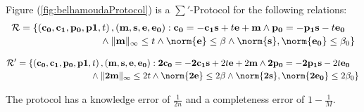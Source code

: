 \begin{theorem}
  Figure (\ref{fig:belhamoudaProtocol}) is a $\sum'$-Protocol for the following
  relations:
  \begin{equation}
    \label{equ:zkp_relation1}
    \begin{multlined}
      \mathcal{R} = \{ \left( \mathbf{c_0,c_1,p_0,p1},t \right), (\mathbf{m,
        s, e, e_0}): \mathbf{c_0 = -c_1s} + t\mathbf{e} +
      \mathbf{m}
      \wedge \mathbf{p_0 = -p_1s} - t\mathbf{e_{0}} \\
      \wedge \norminf{\mathbf{m}} \leq t
      \wedge \norm{\mathbf{e}} \leq \beta \wedge
      \norm{\mathbf{s}},\norm{\mathbf{e_0}} \leq \beta_0 \}
    \end{multlined}
  \end{equation}

  \begin{equation}
    \label{eq:zkp_relation2}
    \begin{multlined}
      \mathcal{R'} = \{ \left( \mathbf{c_0,c_1,p_0,p1},t \right), (\mathbf{m,
        s, e, e_0}): \mathbf{2c_0 = -2c_1s} + 2t\mathbf{e} + 2\mathbf{m} \wedge
      \mathbf{2p_0 = -2p_1s} - 2t\mathbf{e_{0}} \\
      \wedge
      \norminf{\mathbf{2m}} \leq 2t
      \wedge \norm{\mathbf{2e}} \leq 2\beta \wedge
      \norm{\mathbf{2s}},\norm{\mathbf{2e_0}} \leq 2\beta_0 \}
    \end{multlined}
  \end{equation}


  The protocol has a knowledge error of $\frac{1}{2n}$ and a completeness
  error of $1 - \frac{1}{M}$.

  \label{theo:BVZKPBenhamouda}
\end{theorem}

